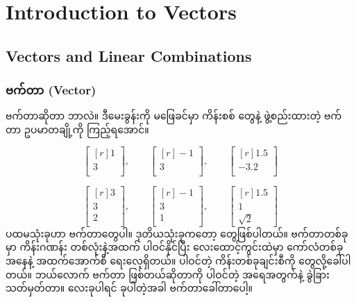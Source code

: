 \chapter{Introduction to Vectors} \label{ch:ch01}

\section{Vectors and Linear Combinations}
\subsection*{ဗက်တာ (Vector)}
 ဗက်တာဆိုတာ ဘာလဲ။ ဒီမေးခွန်းကို မဖြေခင်မှာ ကိန်းစစ်  တွေနဲ့ ဖွဲ့စည်းထားတဲ့ ဗက်တာ ဥပမာတချို့ကို ကြည့်ရအောင်။ 

\[
\begin{bmatrix*}[r] 1\\ 3\\ \end{bmatrix*}, \qquad
\begin{bmatrix*}[r] -1\\ 3\\ \end{bmatrix*}, \qquad
\begin{bmatrix*}[r] 1.5\\ -3.2\\ \end{bmatrix*}
\]

\[
\begin{bmatrix*}[r] 3\\ 3\\ 2\\\end{bmatrix*}, \qquad
\begin{bmatrix*}[r] -1\\ 3\\ 1\\\end{bmatrix*}, \qquad
\begin{bmatrix*}[r] 1.5\\ 1\\ \sqrt{2}\end{bmatrix*}
\]
ပထမသုံးခုဟာ  ဗက်တာတွေပါ။ ဒုတိယသုံးခုကတော့  တွေဖြစ်ပါတယ်။ ဗက်တာတစ်ခုမှာ ကိန်းဂဏန်း တစ်လုံးနဲ့အထက် ပါဝင်နိုင်ပြီး လေးထောင့်ကွင်းထဲမှာ ကော်လံတစ်ခုအနေနဲ့ အထက်အောက်စီ ရေးလေ့ရှိတယ်။ ပါဝင်တဲ့ ကိန်းတစ်ခုချင်းစီကို  တွေလို့ခေါ်ပါတယ်။ ဘယ်လောက်  ဗက်တာ ဖြစ်တယ်ဆိုတာကို ပါဝင်တဲ့  အရေအတွက်နဲ့ ခွဲခြားသတ်မှတ်တာ။  လေးခုပါရင်   ခုပါတဲ့အခါ  ဗက်တာခေါ်တာပေါ့။

